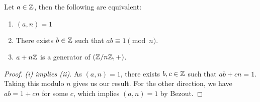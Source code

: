 \documentclass[a4paper]{scrartcl}
\begin{document}
\begin{lemma}
  Let $a \in \mathbb{Z}$, then the following are equivalent:
  \begin{enumerate}[label=(\roman*)]
  \item $(a, n) = 1$
  \item There exists $b \in \mathbb{Z}$ such that $ab \equiv 1 \pmod{n}$.
  \item $a + n\mathbb{Z}$ is a generator of $(\mathbb{Z}/n\mathbb{Z}, +)$.
  \end{enumerate}
\end{lemma}
\begin{proof} \emph{(i) implies (ii)}. 
As $(a, n) = 1$, there exists $b, c \in \mathbb{Z}$ such that $ab + cn = 1$. Taking this modulo $n$ gives us our result. For the other direction, we have $ab = 1 + cn$ for some $c$, which implies $(a, n) = 1$ by Bezout.
\end{proof}
\end{document}
